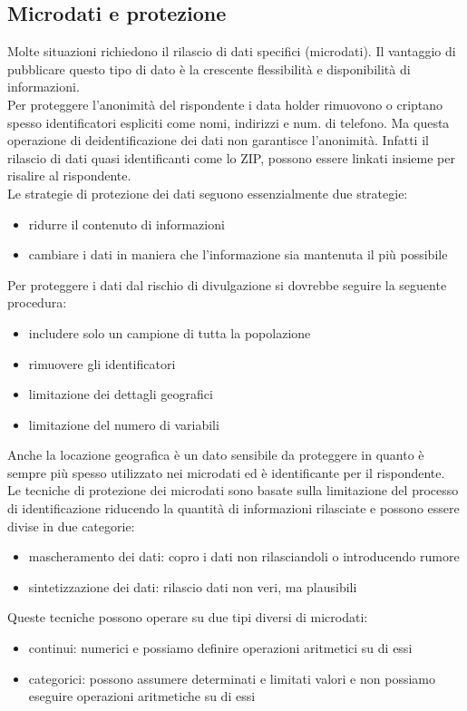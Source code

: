 \subsection{Microdati e protezione}
Molte situazioni richiedono il rilascio di dati specifici (microdati). Il vantaggio di pubblicare questo tipo di dato è la crescente flessibilità e disponibilità di informazioni.\\
Per proteggere l'anonimità del rispondente i data holder rimuovono o criptano spesso identificatori espliciti come nomi, indirizzi e num. di telefono. Ma questa operazione di deidentificazione dei dati non garantisce l'anonimità. Infatti il rilascio di dati quasi identificanti come lo ZIP, possono essere linkati insieme per risalire al rispondente.\\
Le strategie di protezione dei dati seguono essenzialmente due strategie:
\begin{itemize}
    \item ridurre il contenuto di informazioni
    \item cambiare i dati in maniera che l'informazione sia mantenuta il più possibile
\end{itemize}
Per proteggere i dati dal rischio di divulgazione si dovrebbe seguire la seguente procedura:
\begin{itemize}
    \item includere solo un campione di tutta la popolazione
    \item rimuovere gli identificatori
    \item limitazione dei dettagli geografici
    \item limitazione del numero di variabili 
\end{itemize}
Anche la locazione geografica è un dato sensibile da proteggere in quanto è sempre più spesso utilizzato nei microdati ed è identificante per il rispondente.\\
Le tecniche di protezione dei microdati sono basate sulla limitazione del processo di identificazione riducendo la quantità di informazioni rilasciate e possono essere divise in due categorie:
\begin{itemize}
    \item mascheramento dei dati: copro i dati non rilasciandoli o introducendo rumore
    \item sintetizzazione dei dati: rilascio dati non veri, ma plausibili
\end{itemize}
Queste tecniche possono operare su due tipi diversi di microdati:
\begin{itemize}
    \item continui: numerici e possiamo definire operazioni aritmetici su di essi
    \item categorici: possono assumere determinati e limitati valori e non possiamo eseguire operazioni aritmetiche su di essi
\end{itemize}

